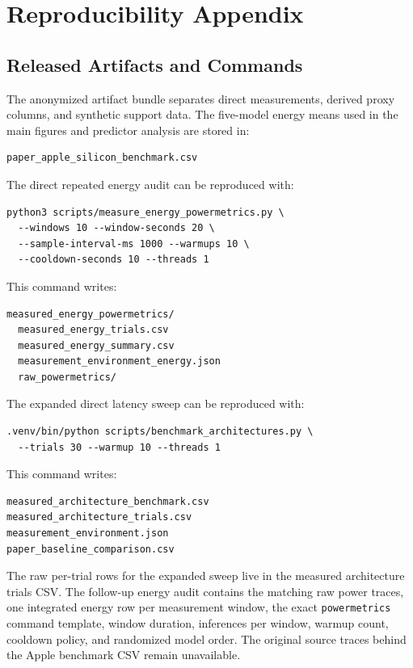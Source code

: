 \documentclass{svproc}
\begin{document}
\section{Reproducibility Appendix}
\label{sec:appendix}

\subsection{Released Artifacts and Commands}
The anonymized artifact bundle separates direct measurements, derived proxy columns,
and synthetic support data. The five-model energy means used in the main
figures and predictor analysis are stored in:
\begin{verbatim}
paper_apple_silicon_benchmark.csv
\end{verbatim}
The direct repeated energy audit can be reproduced with:
\begin{verbatim}
python3 scripts/measure_energy_powermetrics.py \
  --windows 10 --window-seconds 20 \
  --sample-interval-ms 1000 --warmups 10 \
  --cooldown-seconds 10 --threads 1
\end{verbatim}
This command writes:
\begin{verbatim}
measured_energy_powermetrics/
  measured_energy_trials.csv
  measured_energy_summary.csv
  measurement_environment_energy.json
  raw_powermetrics/
\end{verbatim}
The expanded direct latency sweep can be reproduced with:
\begin{verbatim}
.venv/bin/python scripts/benchmark_architectures.py \
  --trials 30 --warmup 10 --threads 1
\end{verbatim}
This command writes:
\begin{verbatim}
measured_architecture_benchmark.csv
measured_architecture_trials.csv
measurement_environment.json
paper_baseline_comparison.csv
\end{verbatim}
The raw per-trial rows for the expanded sweep live in the measured architecture
trials CSV. The follow-up energy audit
contains the matching raw power traces, one integrated energy row per
measurement window, the exact \texttt{powermetrics} command template, window
duration, inferences per window, warmup count, cooldown policy, and randomized
model order. The original source traces behind the Apple benchmark CSV remain
unavailable.
\end{document}
